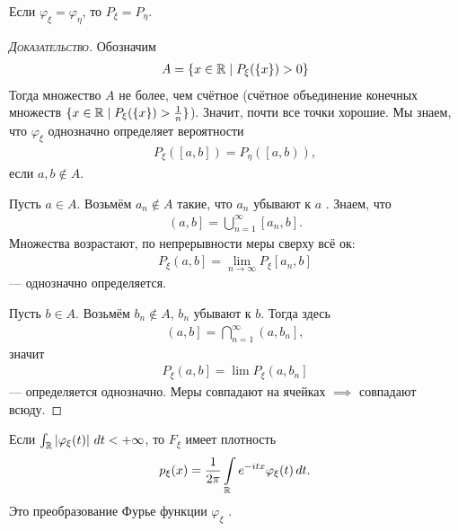 \documentclass[../main.tex]{subfiles}
\begin{document}
\begin{crly}
 Если $ \varphi_\xi = \varphi_\eta $, то $ P_\xi = P_\eta $.
\end{crly}
\begin{proof}[\normalfont\textsc{Доказательство}]
 Обозначим
 \begin{align*}
  A = \left\{ x \in \mathbb{R} \;\middle|\; P_\xi(\left\{ x \right\}) > 0 \right\}
 \end{align*} Тогда множество $ A $ не более, чем счётное (счётное объединение конечных множеств $\{x \in \mathbb{R} \mid P_{\xi}(\{x\}) > \frac{1}{n}\}$). Значит, почти все точки хорошие. Мы знаем, что $ \varphi_\xi $ однозначно определяет вероятности
 \begin{align*}
  P_\xi([a,b]) = P_\eta( \left[a, b\right)),
 \end{align*} если $ a,b \notin A $.

 Пусть $ a \in A $.  Возьмём  $ a_n \notin A $ такие, что  $ a_n $ убывают к  $ a $ . Знаем, что
 \begin{align*}
  \left(a, b\right]  = \bigcup_{n=1}^{\infty}[a_n,b].
 \end{align*} Множества возрастают, по непрерывности меры сверху всё ок:
 \begin{align*}
  P_\xi \left(a, b\right] = \lim_{n \to \infty} P_\xi [a_n,b] 
 \end{align*} --- однозначно определяется.

 Пусть $ b \in A $. Возьмём  $ b_n \notin A $,  $ b_n $ убывают к  $ b $. Тогда здесь
 \begin{align*}
  \left(a, b\right] = \bigcap_{n=1}^{\infty} \left(a, b_n\right] ,
 \end{align*} значит
 \begin{align*}
  P_\xi \left(a, b\right] = \lim P_\xi \left(a, b_n\right]   
 \end{align*} --- определяется однозначно. Меры совпадают на ячейках $  \implies $ совпадают всюду.

\end{proof}
\begin{crly}
 Если $ \int_{\mathbb{R}} \left| \varphi_\xi(t) \right|\,dt < +\infty  $, то $ F_\xi $ имеет плотность
 \begin{align*}
  p_\xi(x) = \frac{1}{2\pi} \int\limits_{\mathbb{R}} e^{-itx}\varphi_\xi(t)\,dt. 
 \end{align*} Это преобразование Фурье функции $\varphi_\xi$ .
\end{crly}
\end{document}
